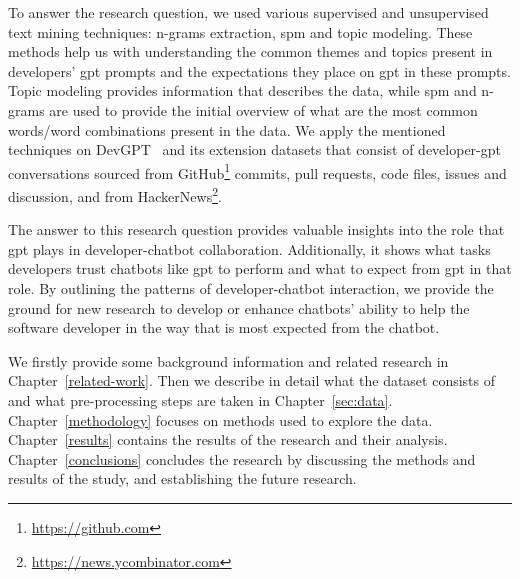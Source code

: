 To answer the research question, we used various supervised and unsupervised text mining techniques: n-grams extraction, \acrfull{spm} and topic modeling. These methods help us with understanding the common themes and topics present in developers' \acrshort{gpt} prompts and the expectations they place on \acrshort{gpt} in these prompts. Topic modeling provides information that describes the data, while \acrshort{spm} and n-grams are used to provide the initial overview of what are the most common words/word combinations present in the data. We apply the mentioned techniques on DevGPT~\cite{devgpt} and its extension datasets that consist of developer-\acrshort{gpt} conversations sourced from GitHub\footnote{\url{https://github.com}} commits, pull requests, code files, issues and discussion, and from HackerNews\footnote{\url{https://news.ycombinator.com}}. 

The answer to this research question provides valuable insights into the role that \acrshort{gpt} plays in developer-chatbot collaboration. Additionally, it shows what tasks developers trust chatbots like \acrshort{gpt} to perform and what to expect from \acrshort{gpt} in that role. By outlining the patterns of developer-chatbot interaction, we provide the ground for new research to develop or enhance chatbots' ability to help the software developer in the way that is most expected from the chatbot.

We firstly provide some background information and related research in Chapter~\ref{related-work}. Then we describe in detail what the dataset consists of and what pre-processing steps are taken in Chapter~\ref{sec:data}. Chapter~\ref{methodology} focuses on methods used to explore the data. Chapter~\ref{results} contains the results of the research and their analysis. Chapter~\ref{conclusions} concludes the research by discussing the methods and results of the study, and establishing the future research.
